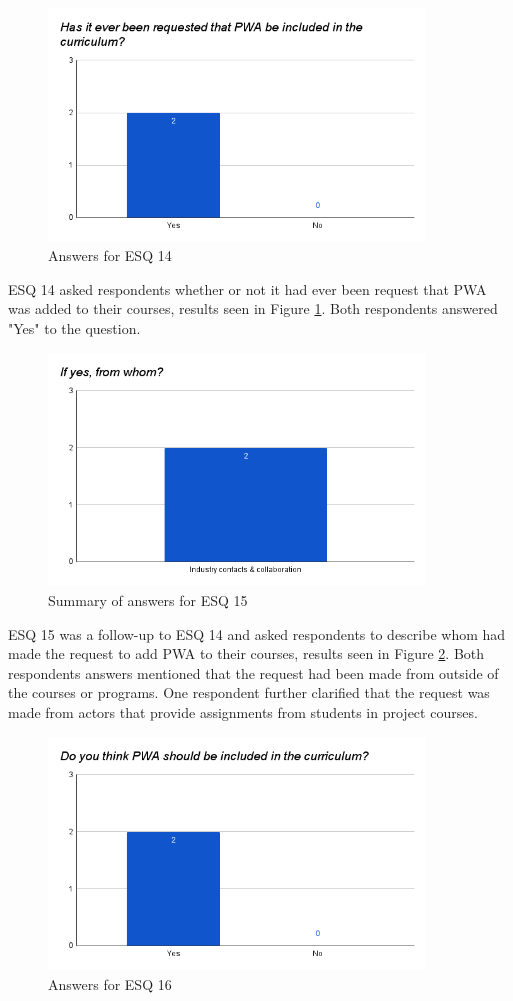 \documentclass[a4paper,12pt]{article}
\begin{document}
\begin{figure}[ht!]
    \centering
    \includegraphics[width=10cm]{img/Results/esq14.png}
    \caption{Answers for ESQ 14}
    \label{fig:res_eduq14}
\end{figure}

\newpage
ESQ 14 asked respondents whether or not it had ever been request that PWA was added to their courses, results seen in Figure \ref{fig:res_eduq14}. Both respondents answered "Yes" to the question.

\begin{figure}[ht!]
    \centering
    \includegraphics[width=10cm]{img/Results/esq15.png}
    \caption{Summary of answers for ESQ 15}
    \label{fig:res_eduq15}
\end{figure}

ESQ 15 was a follow-up to ESQ 14 and asked respondents to describe whom had made the request to add PWA to their courses, results seen in Figure \ref{fig:res_eduq15}. Both respondents answers mentioned that the request had been made from outside of the courses or programs. One respondent further clarified that the request was made from actors that provide assignments from students in project courses.

\newpage
\begin{figure}[ht!]
    \centering
    \includegraphics[width=10cm]{img/Results/esq16.png}
    \caption{Answers for ESQ 16}
    \label{fig:res_eduq16}
\end{figure}
\end{document}
